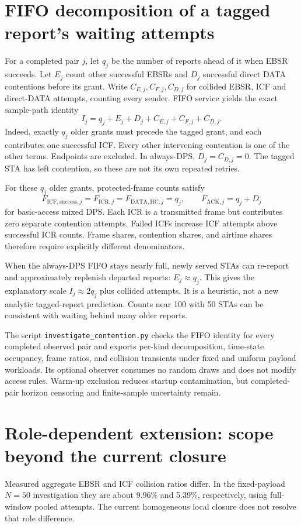 \documentclass[11pt,a4paper]{article}
\begin{document}
\section{FIFO decomposition of a tagged report's waiting attempts}
For a completed pair $j$, let $q_j$ be the number of reports ahead of it when
EBSR succeeds. Let $E_j$ count other successful EBSRs and $D_j$ successful
direct DATA contentions before its grant. Write $C_{E,j},C_{F,j},C_{D,j}$
for collided EBSR, ICF and direct-DATA attempts, counting every sender.
FIFO service yields the exact sample-path identity
\begin{equation}
\boxed{I_j=q_j+E_j+D_j+C_{E,j}+C_{F,j}+C_{D,j}}.
\end{equation}
Indeed, exactly $q_j$ older grants must precede the tagged grant, and each
contributes one successful ICF. Every other intervening contention is one
of the other terms. Endpoints are excluded. In always-DPS,
$D_j=C_{D,j}=0$. The tagged STA has left contention, so these are not its
own repeated retries.

For these $q_j$ older grants, protected-frame counts satisfy
\begin{equation}
F_{\mathrm{ICF,success},j}=F_{\mathrm{ICR},j}
=F_{\mathrm{DATA,HC},j}=q_j,\qquad
F_{\mathrm{ACK},j}=q_j+D_j
\end{equation}
for basic-access mixed DPS. Each ICR is a transmitted frame but contributes
zero separate contention attempts. Failed ICFs increase ICF attempts above
successful ICR counts. Frame shares, contention shares, and airtime shares
therefore require explicitly different denominators.

When the always-DPS FIFO stays nearly full, newly served STAs can re-report
and approximately replenish departed reports: $E_j\approx q_j$. This gives
the explanatory scale $I_j\approx2q_j$ plus collided attempts. It is a
heuristic, not a new analytic tagged-report prediction. Counts near 100 with
50 STAs can be consistent with waiting behind many older reports.

The script \texttt{investigate\_contention.py} checks the FIFO identity for
every completed observed pair and exports per-kind decomposition, time-state
occupancy, frame ratios, and collision transients under fixed and uniform
payload workloads. Its optional observer consumes no random draws and does
not modify access rules. Warm-up exclusion reduces startup contamination,
but completed-pair horizon censoring and finite-sample uncertainty remain.


\section{Role-dependent extension: scope beyond the current closure}
Measured aggregate EBSR and ICF collision ratios differ. In the fixed-payload
$N=50$ investigation they are about 9.96\% and 5.39\%, respectively, using
full-window pooled attempts. The current homogeneous local closure does not
resolve that role difference.
\end{document}
